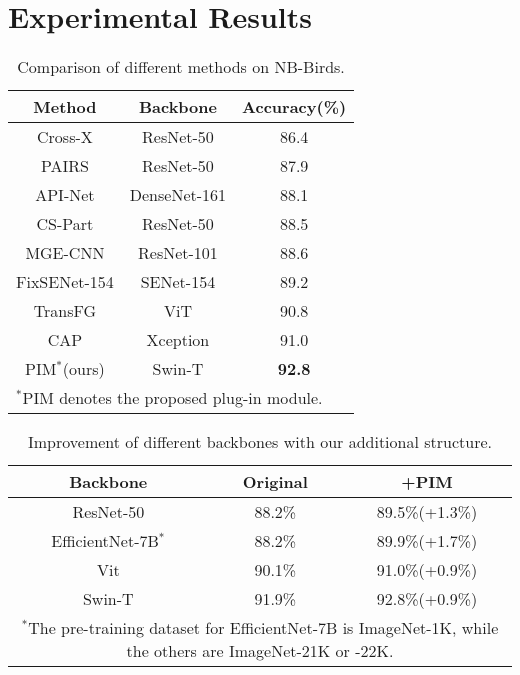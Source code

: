 \documentclass[conference]{IEEEtran}
\begin{document}
\section{Experimental Results}



\begin{table}
\caption{Comparison of different methods on NB-Birds.}
\begin{center}
\begin{tabular}{c|c|c}
Method & Backbone & Accuracy(\%) \\
\hline
Cross-X\cite{Cross_X} & ResNet-50 & 86.4 \\
PAIRS\cite{PAIRS} & ResNet-50 & 87.9 \\
API-Net\cite{API_Net} & DenseNet-161 & 88.1 \\
CS-Part\cite{CS_PART} & ResNet-50 & 88.5 \\
MGE-CNN\cite{MGE_CNN} & ResNet-101 & 88.6 \\
FixSENet-154\cite{FixSeNet_154} & SENet-154 & 89.2 \\
TransFG\cite{TransFG} & ViT & 90.8 \\
CAP\cite{CAP} & Xception & 91.0 \\
\hline
PIM$^{\mathrm{*}}$(ours) & Swin-T & \textbf{92.8} \\
\hline
\multicolumn{3}{l}{$^{\mathrm{*}}$PIM denotes the proposed plug-in module.}

\end{tabular}
\label{tab2}
\end{center}
\end{table}


\begin{table}[!tp]
\caption{ Improvement of different backbones with our additional structure.}
\begin{center}
\begin{tabular}{|c|c|c|}
\hline
Backbone & Original & +PIM \\
\hline
ResNet-50 & 88.2\% & 89.5\%(+1.3\%) \\
\hline
EfficientNet-7B$^{\mathrm{*}}$ & 88.2\% & 89.9\%(+1.7\%) \\
\hline
Vit & 90.1\% & 91.0\%(+0.9\%) \\
\hline
Swin-T & 91.9\% & 92.8\%(+0.9\%) \\
\hline
\multicolumn{3}{p{26em}}{$^{\mathrm{*}}$The pre-training dataset for EfficientNet-7B is ImageNet-1K, while the others are ImageNet-21K or -22K.}

\end{tabular}
\label{tab3}
\end{center}
\end{table}
\end{document}
